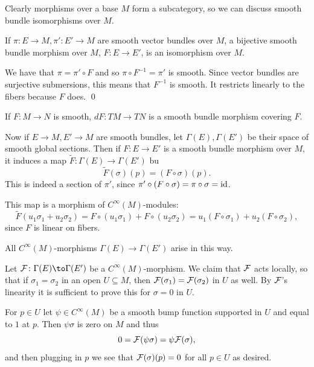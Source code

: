 \edefn

Clearly morphisms over a base $M$ form a subcategory, so we can discuss {\emphcolor smooth bundle isomorphisms over $M$}.

\bprop

    If $\pi\colon E\to M,\pi'\colon E'\to M$ are smooth vector bundles over $M$, a bijective smooth bundle morphism over $M$, $F\colon E\to E'$,
    is an isomorphism over $M$.

\eprop

\bproof

    We have that $\pi=\pi'\circ F$ and so $\pi\circ F^{-1}=\pi'$ is smooth.
    Since vector bundles are surjective submersions, this means that $F^{-1}$ is smooth.
    It restricts linearly to the fibers because $F$ does.
    \qed

\eproof

\bexam

    If $F\colon M\to N$ is smooth, $dF\colon TM\to TN$ is a smooth bundle morphism covering $F$.

\eexam

Now if $E\to M,E'\to M$ are smooth bundles, let $\Gamma(E),\Gamma(E')$ be their space of smooth global sections.
Then if $F\colon E\to E'$ is a smooth bundle morphism over $M$, it induces a map $\tilde F\colon\Gamma(E)\to\Gamma(E')$ bu
$$ \tilde F(\sigma)(p) = (F\circ\sigma)(p) . $$
This is indeed a section of $\pi'$, since $\pi'\circ(F\circ\sigma)=\pi\circ\sigma={\rm id}$.

This map is a morphism of $C^\infty(M)$-modules:
$$ \tilde F(u_1\sigma_1+u_2\sigma_2) = F\circ(u_1\sigma_1) + F\circ(u_2\sigma_2) = u_1(F\circ\sigma_1) + u_2(F\circ\sigma_2), $$
since $F$ is linear on fibers.

\blemm

    All $C^\infty(M)$-morphisms $\Gamma(E)\to\Gamma(E')$ arise in this way.

\elemm

\bproof

    Let $\c F\colon\Gamma(E)\to\Gamma(E')$ be a $C^\infty(M)$-morphism.
    We claim that ${\cal F}$ acts locally, so that if $\sigma_1=\sigma_2$ in an open $U\subseteq M$, then ${\cal F}(\sigma_1)={\cal F}(\sigma_2)$ in $U$ as well.
    By ${\cal F}$'s linearity it is sufficient to prove this for $\sigma=0$ in $U$.

    For $p\in U$ let $\psi\in C^\infty(M)$ be a smooth bump function supported in $U$ and equal to $1$ at $p$.
    Then $\psi\sigma$ is zero on $M$ and thus
    $$ 0 = {\cal F}(\psi\sigma) = \psi{\cal F}(\sigma) , $$
    and then plugging in $p$ we see that ${\cal F}(\sigma)(p)=0$ for all $p\in U$ as desired.


